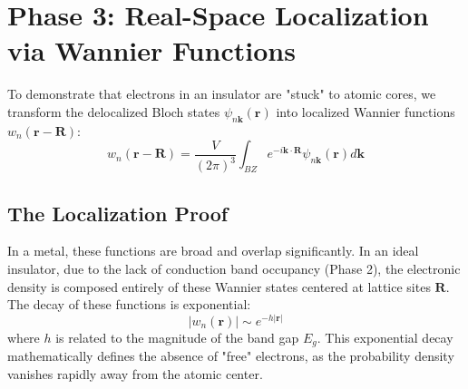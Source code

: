 \section{Phase 3: Real-Space Localization via Wannier Functions}
To demonstrate that electrons in an insulator are "stuck" to atomic cores, we transform the delocalized Bloch states $\psi_{n\mathbf{k}}(\mathbf{r})$ into localized Wannier functions $w_n(\mathbf{r} - \mathbf{R})$:
$$w_n(\mathbf{r} - \mathbf{R}) = \frac{V}{(2\pi)^3} \int_{BZ} e^{-i\mathbf{k} \cdot \mathbf{R}} \psi_{n\mathbf{k}}(\mathbf{r}) d\mathbf{k}$$

\subsection{The Localization Proof}
In a metal, these functions are broad and overlap significantly. In an ideal insulator, due to the lack of conduction band occupancy (Phase 2), the electronic density is composed entirely of these Wannier states centered at lattice sites $\mathbf{R}$. The decay of these functions is exponential:
$$|w_n(\mathbf{r})| \sim e^{-h|\mathbf{r}|}$$
where $h$ is related to the magnitude of the band gap $E_g$. This exponential decay mathematically defines the absence of "free" electrons, as the probability density vanishes rapidly away from the atomic center.
